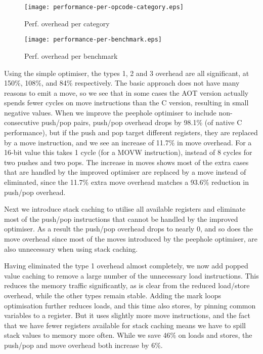 \begin{figure}
 \centering
 \begin{minipage}{0.45\textwidth}
  \centering
  \texttt{[image: performance-per-opcode-category.eps]}
  \caption{Perf. overhead per category}
  \label{fig-performance-per-opcode-category}
 \end{minipage}\hfill
 \begin{minipage}{0.45\textwidth}
  \centering
  \texttt{[image: performance-per-benchmark.eps]}
  \caption{Perf. overhead per benchmark}
  \label{fig-performance-per-benchmark}
 \end{minipage}
\end{figure}

Using the simple optimiser, the types 1, 2 and 3 overhead are all significant, at 150\%,  108\%, and 84\% respectively. The basic approach does not have many reasons to emit a move, so we see that in some cases the AOT version actually spends fewer cycles on move instructions than the C version, resulting in small negative values. When we improve the peephole optimiser to include non-consecutive push/pop pairs, push/pop overhead drops by 98.1\% (of native C performance), but if the push and pop target different registers, they are replaced by a move instruction, and we see an increase of 11.7\% in move overhead. For a 16-bit value this takes 1 cycle (for a MOVW instruction), instead of 8 cycles for two pushes and two pops. The increase in moves shows most of the extra cases that are handled by the improved optimiser are replaced by a move instead of eliminated, since the 11.7\% extra move overhead matches a 93.6\% reduction in push/pop overhead.

Next we introduce stack caching to utilise all available registers and eliminate most of the push/pop instructions that cannot be handled by the improved optimiser. As a result the push/pop overhead drops to nearly 0, and so does the move overhead since most of the moves introduced by the peephole optimiser, are also unnecessary when using stack caching.

Having eliminated the type 1 overhead almost completely, we now add popped value caching to remove a large number of the unnecessary load instructions. This reduces the memory traffic significantly, as is clear from the reduced load/store overhead, while the other types remain stable. Adding the mark loops optimisation further reduces loads, and this time also stores, by pinning common variables to a register. But it uses slightly more move instructions, and the fact that we have fewer registers available for stack caching means we have to spill stack values to memory more often. While we save 46\% on loads and stores, the push/pop and move overhead both increase by 6\%.


